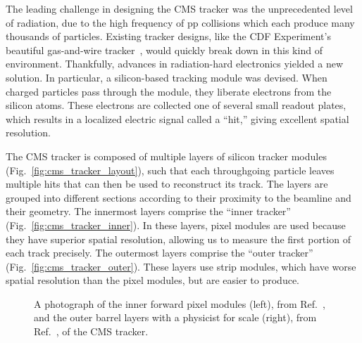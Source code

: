 The leading challenge in designing the CMS tracker was the unprecedented level of radiation, due to the high frequency of pp collisions which each produce many thousands of particles. 
Existing tracker designs, like the CDF Experiment's beautiful gas-and-wire tracker~\cite{CDF:2003xbh}, would quickly break down\footnotemark{} in this kind of environment.
Thankfully, advances in radiation-hard electronics yielded a new solution. 
In particular, a silicon-based tracking module was devised. 
When charged particles pass through the module, they liberate electrons from the silicon atoms. 
These electrons are collected one of several small readout plates, which results in a localized electric signal called a ``hit,'' giving excellent spatial resolution. 

The CMS tracker is composed of multiple layers of silicon tracker modules (Fig.~\ref{fig:cms_tracker_layout}), such that each throughgoing particle leaves multiple hits that can then be used to reconstruct its track. 
The layers are grouped into different sections according to their proximity to the beamline and their geometry. 
The innermost layers comprise the ``inner tracker'' (Fig.~\ref{fig:cms_tracker_inner}). 
In these layers, pixel modules are used because they have superior spatial resolution, allowing us to measure the first portion of each track precisely. 
The outermost layers comprise the ``outer tracker'' (Fig.~\ref{fig:cms_tracker_outer}). 
These layers use strip modules, which have worse spatial resolution than the pixel modules, but are easier to produce. 

\begin{figure}[htb]
    \centering
    \quad
    \caption{
        A photograph of the inner forward pixel modules (left), from Ref.~\cite{Hoch:2017264}, and the outer barrel layers with a physicist for scale (right), from Ref.~\cite{Maximilien:995912}, of the CMS tracker. 
    }
    \label{fig:cms_tracker_pictures}
\end{figure}

